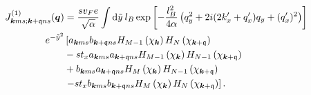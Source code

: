\begin{equation}
  \begin{split}
    J^{(1)}_{\bm{k}ms; \bm{k}+\mathfrak{q} ns}(\bm{q}) &=
    \frac{s v_F e}{\sqrt{\alpha }} \int \mathrm{d}\tilde{y} \: l_B
    \exp \left[
      -\frac{l_{B}^2}{4 \alpha } \left(q_{y}^2 + 2i (2 k' _x + q' _x) q_{y} + (q'_x)^2 \right)
    \right]
   \\
    e^{-\tilde{y}^2}
   &\left[
    a_{\bm{k}ms}b_{\bm{k} + \mathfrak{q} ns}
    H_{M-1} \left(  \chi_{\bm{k}} \right)
    H_N\left( \chi_{\bm{k} + \mathfrak{q}} \right) \right.\\
    &- s t_{x} a_{\bm{k}ms}a_{\bm{k} + \mathfrak{q} ns}
    H_{M-1} \left( \chi_{\bm{k}} \right)
    H_{N-1}\left( \chi_{\bm{k} + \mathfrak{q}} \right)\\
   & +
    b_{\bm{k}ms} a_{\bm{k} + \mathfrak{q} ns}
    H_M \left( \chi_{\bm{k}} \right)
    H_{N-1} \left( \chi_{\bm{k} + \mathfrak{q}} \right)\\
    &\left. - s t_{x}
    b_{\bm{k}ms} b_{\bm{k} + \mathfrak{q} ns}
    H_M \left( \chi_{\bm{k}} \right)
    H_{N} \left(  \chi_{\bm{k} + \mathfrak{q}}\right)
    \right].
  \end{split}
\end{equation}

